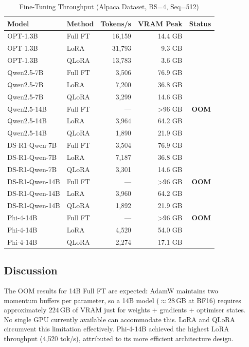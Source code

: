 \documentclass[11pt,a4paper]{article}
\newcommand{\oom}{\textcolor{oomred}{\textbf{OOM}}}
\newcommand{\ok}{\textcolor{okgreen}{\checkmark}}
\begin{document}
\begin{table}[h!]
\centering
\caption{Fine-Tuning Throughput (Alpaca Dataset, BS=4, Seq=512)}
\label{tab:finetune}
\begin{tabular}{llrrr}
\toprule
\textbf{Model} & \textbf{Method} & \textbf{Tokens/s} & \textbf{VRAM Peak} & \textbf{Status} \\
\midrule
OPT-1.3B   & Full FT & 16{,}159 & 14.4 GB & \ok \\
OPT-1.3B   & LoRA    & 31{,}793 &  9.3 GB & \ok \\
OPT-1.3B   & QLoRA   & 13{,}783 &  3.6 GB & \ok \\
\midrule
Qwen2.5-7B & Full FT &  3{,}506 & 76.9 GB & \ok \\
Qwen2.5-7B & LoRA    &  7{,}200 & 36.8 GB & \ok \\
Qwen2.5-7B & QLoRA   &  3{,}299 & 14.6 GB & \ok \\
\midrule
Qwen2.5-14B & Full FT & ---     & \textgreater{}96 GB & \oom \\
Qwen2.5-14B & LoRA    & 3{,}964 & 64.2 GB & \ok \\
Qwen2.5-14B & QLoRA   & 1{,}890 & 21.9 GB & \ok \\
\midrule
DS-R1-Qwen-7B & Full FT & 3{,}504 & 76.9 GB & \ok \\
DS-R1-Qwen-7B & LoRA    & 7{,}187 & 36.8 GB & \ok \\
DS-R1-Qwen-7B & QLoRA   & 3{,}301 & 14.6 GB & \ok \\
\midrule
DS-R1-Qwen-14B & Full FT & --- & \textgreater{}96 GB & \oom \\
DS-R1-Qwen-14B & LoRA    & 3{,}960 & 64.2 GB & \ok \\
DS-R1-Qwen-14B & QLoRA   & 1{,}892 & 21.9 GB & \ok \\
\midrule
Phi-4-14B & Full FT & --- & \textgreater{}96 GB & \oom \\
Phi-4-14B & LoRA    & 4{,}520 & 54.0 GB & \ok \\
Phi-4-14B & QLoRA   & 2{,}274 & 17.1 GB & \ok \\
\bottomrule
\end{tabular}
\end{table}

\subsection{Discussion}
The OOM results for 14B Full FT are expected: AdamW maintains two momentum
buffers per parameter, so a 14B model ($\approx28$\,GB at BF16) requires
approximately $224$\,GB of VRAM just for weights + gradients + optimiser states.
No single GPU currently available can accommodate this. LoRA and QLoRA circumvent
this limitation effectively. Phi-4-14B achieved the highest LoRA throughput
(4{,}520 tok/s), attributed to its more efficient architecture design.
\end{document}
